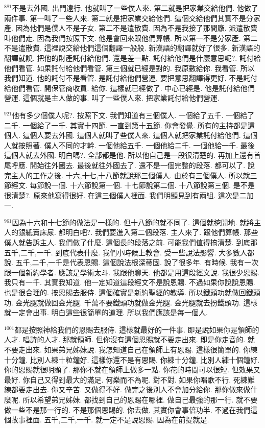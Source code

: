 \documentclass{book}
\begin{document}
$^{881}$不是去外國.
出門遠行.
他就叫了一些僕人來.
第二就是把家業交給他們.
他做了兩件事.
第一叫了一些人來.
第二就是把家業交給他們.
這個交給他們其實不是分家產.
因為他們是僕人不是子女.
第二不是遣散費.
因為不是我接了那間廠.
派遣散費叫他們走.
因為我們按照下文.
他是會回來跟他們算帳.
所以第一不是分家產.
第二不是遣散費.
這裡說交給他們這個翻譯一般般.
新漢語的翻譯就好了很多.
新漢語的翻譯就說.
把他的財產託付給他們.
還是差一點.
託付給他們是什麼意思呢?.
託付給他們看管.
如果託付給他們看管.
第三個就已經是對的.
我原數給你.
我看管.
所以我們知道.
他的託付不是看管.
是託付給他們營運.
要把意思翻譯得更好.
不是託付給他們看管.
開保管商收買.
給你.
這樣就已經做了.
中心已經是.
他是託付給他們營運.
這個就是主人做的事.
叫了一些僕人來.
把家業託付給他們營運.

$^{921}$他有多少個僕人呢?.
按照下文.
我們知道有三個僕人.
一個給了五千.
一個給了二千.
一個給了一千.
其實十四節.
一直到第十五節.
你會發覺.
所有的主持都是這個人.
這個人要去外國.
這個人就叫了些僕人來.
這個人就把家業託付給他們.
這個人就按照著.
僕人不同的才幹.
一個他給五千.
一個他給二千.
一個他給一千.
最後這個人就去外國.
明白嗎?.
全部都是他.
所以他自己是一段很清楚的.
再加上還有首尾呼應.
開始往外國去.
最後就往外國去了.
還不是一個完整的段落.
都可以了.
說完主人的工作之後.
十六,十七,十八節就說那三個僕人.
由於有三個僕人.
所以就三節經文.
每節說一個.
十六節說第一個.
十七節說第二個.
十八節說第三個.
是不是很清楚?.
原來他寫得很好.
在這三個僕人裡面.
我們明顯見到有兩組.
這次是二加一.

$^{961}$因為十六和十七節的做法是一樣的.
但十八節的就不同了.
這個就挖開地.
就將主人的銀紙賣床尿.
都明白吧?.
我們要進入第二個段落.
主人來了.
跟他們算帳.
那些僕人就告訴主人.
我們做了什麼.
這個長的段落之前.
可能我們值得搞清楚.
到底那五千,二千,一千.
到底代表什麼.
我們小時候上教會.
受一些說法影響.
大多數人都說.
五千,二千,一千是代表恩賜.
這個說法根深蒂固.
說了很多年.
有時候.
我有一次跟一個新約學者.
應該是學術太斗.
我跟他聊天.
他都是用這段經文說.
我很少恩賜.
我只有一千.
其實我知道.
他一定知道這段經文不是說恩賜.
不過如果你說說恩賜.
也是很合理的.
按恩賜去服侍.
這個確實是新約聖經的教導.
所以鐵頭功就做回鐵頭功.
金光腿就做回金光腿.
千萬不要鐵頭功就做金光腿.
金光腿就去扮鐵頭功.
這樣就一定會出事.
明白這些很簡單的道理.
所以我們應該是每一個人.

$^{1001}$都是按照神給我們的恩賜去服侍.
這樣就最好的一件事.
即是說如果你是領師的人才.
唱詩的人才.
那就領師.
但你沒有這個恩賜就不要走出來.
即是你走音的.
就不要走出來.
如果弟兄姊妹說.
我怎知道自己在領師上有恩賜.
這樣很簡單的.
你練十分鐘.
比別人練十粒鐘好.
這樣你還不是有恩賜.
你練十分鐘.
比別人練十個鐘好.
你的恩賜就很明顯了.
那你不就在領師上做多一點.
你花的時間可以很短.
但效果又最好.
你自己又得到最大的滿足.
何樂而不為呢.
對不對.
如果你唱歌不行.
死練難練都要走出去.
你又辛苦.
又做得不好.
做完之後別人不會加分給你.
那你做來做什麼呢.
所以希望弟兄姊妹.
都找到自己的恩賜在哪裡.
做自己最強的那一行.
就不要做一些不是那一行的.
不是那個恩賜的.
你去做.
其實你會事倍功半.
不過在我們這個故事裡面.
五千,二千,一千.
就一定不是說恩賜.
因為在前提就是.
\end{document}
